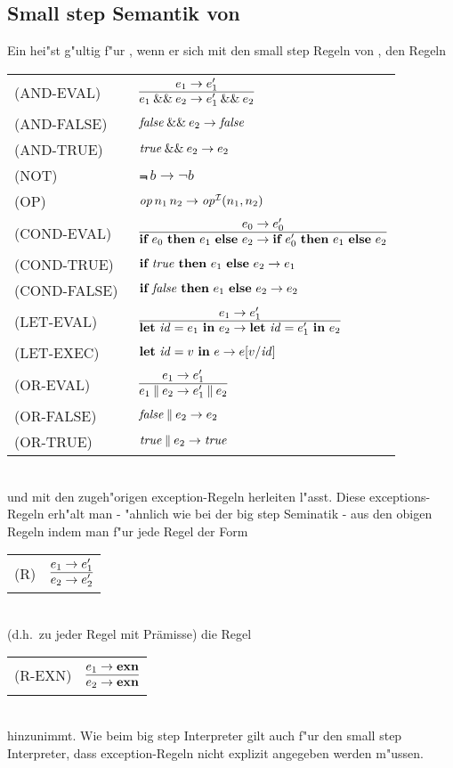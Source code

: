 \subsection{Small step Semantik von \LONE}

Ein  hei"st g"ultig f"ur \LONE, wenn er sich mit den small step Regeln von \LZERO, den Regeln\\[5mm]
  \begin{tabular}{ll}
    \mbox{(AND-EVAL)}     & $\regel{e_1 \to e_1'}
                                 {\andalso{e_1}{e_2} \to \andalso{e_1'}{e_2}}$\\[5mm]
    \mbox{(AND-FALSE)}    & ${\text{\it false\/}}\mathbin{\&\&}e_2 \to {\text{\it false\/}}$\\[3mm]
    \mbox{(AND-TRUE)}     & ${\text{\it true\/}}\mathbin{\&\&}e_2 \to e_2$\\[3mm]
    \mbox{(NOT)}          & $\Not\,b \to \neg b$\\[3mm]
    \mbox{(OP)}           & ${\text{\it op\/}}\,n_1\,n_2 \to {\text{\it op\/}}^{{\cal I}}(n_1,n_2)$ \\[3mm]
    \mbox{(COND-EVAL)\ }  & $\regel{e_0 \to e'_0}
                            {\bifte{e_0}{e_1}{e_2} \to \bifte{e'_0}{e_1}{e_2}}$ \\[5mm]
    \mbox{(COND-TRUE)\ }  & $\textbf{if}\ {\text{\it true\/}}\ \textbf{then}\ e_1\ \textbf{else}\ e_2 \to e_1$ \\[3mm]
    \mbox{(COND-FALSE) }  & $\textbf{if}\ {\text{\it false\/}}\ \textbf{then}\ e_1\ \textbf{else}\ e_2 \to e_2$ \\[3mm]
    \mbox{(LET-EVAL)\  }  & $\regel{e_1 \to e'_1}
                            {\bli{\id}{e_1}{e_2} \to \bli{\id}{e'_1}{e_2}}$ \\[5mm]
    \mbox{(LET-EXEC)}       & $\textbf{let}\ {\text{\it id\/}} = v\ \textbf{in}\ e \to e[v/{\text{\it id\/}}]$ \\[5mm]
    \mbox{(OR-EVAL)}      & $\regel{e_1 \to e_1'}
                                   {\orelse{e_1}{e_2} \to \orelse{e_1'}{e_2}}$\\[5mm]
    \mbox{(OR-FALSE)}     & ${\text{\it false\/}}\mathbin{\|}e_2 \to e_2$\\[3mm]
    \mbox{(OR-TRUE)}      & ${\text{\it true\/}}\mathbin{\|}e_2 \to {\text{\it true\/}}$
  \end{tabular}\\[7mm]
und mit den zugeh"origen exception-Regeln herleiten l"asst. Diese exceptions-Regeln erh"alt man - "ahnlich wie
bei der big step Seminatik - aus den obigen Regeln indem man f"ur jede Regel der Form\\[2mm]
  \begin{tabular}{ll}
    \mbox{(R)} & $\regel{e_1 \to e'_1}{e_2 \to e'_2}$
  \end{tabular}\\[3mm]
(d.h.\ zu jeder Regel mit Pr\"amisse) die Regel \\[3mm]
  \begin{tabular}{ll}
    \mbox{(R-EXN)} & $\regel{e_1 \to \exn}{e_2 \to \exn}$
  \end{tabular}\\[3mm]
hinzunimmt. Wie beim big step Interpreter gilt auch f"ur den small step Interpreter, dass exception-Regeln nicht
explizit angegeben werden m"ussen.


